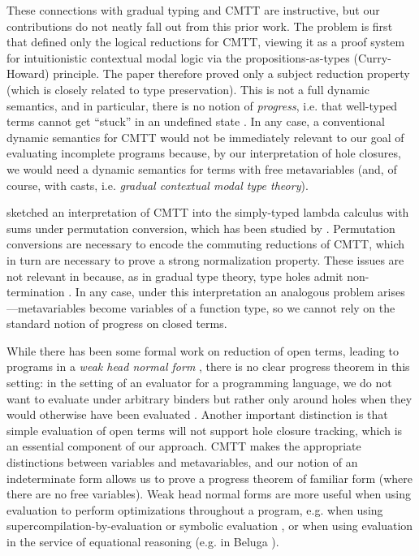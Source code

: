 %
These connections with gradual typing and CMTT are instructive, but our contributions do not neatly fall out from this prior work.
%
The problem is first that \citet{Nanevski2008} defined only the logical reductions for CMTT, viewing it as a proof system for intuitionistic contextual modal logic via the propositions-as-types (Curry-Howard) principle. 
The paper therefore proved only a subject reduction property (which is closely related to type preservation). 
This is not a full dynamic semantics, and in particular, there is no notion of \emph{progress}, i.e. that well-typed terms cannot get ``stuck'' in an undefined state \cite{wright94:_type_soundness}. 
In any case, a conventional dynamic semantics for CMTT would not be immediately relevant to our goal of evaluating incomplete programs because, by our interpretation of hole closures, we would need a dynamic semantics for terms with free metavariables (and, of course, with casts, i.e. \emph{gradual contextual modal type theory}).

\citet{Nanevski2008} sketched an interpretation of CMTT into the simply-typed lambda calculus with sums under permutation conversion, %
which has been studied by \citet{DBLP:journals/iandc/Groote02}. 
Permutation conversions are necessary to encode the commuting reductions of CMTT, which in turn are necessary to prove a strong normalization property. 
These issues are not relevant in \HazelnutLive because, as in gradual type theory, type holes admit non-termination \cite{Siek06a}.  
In any case, under this interpretation an analogous problem arises---metavariables become variables of a function type, so we cannot rely on the standard notion of progress on closed terms. 

While there has been some formal work on reduction of open terms, leading to programs in a \emph{weak head normal form} \cite{barendregt84:_lambda_calculus,DBLP:journals/corr/abs-1009-2789,Abramsky:1990vv}, there is no clear progress theorem in this setting: in the setting of an evaluator for a programming language, we do not want to evaluate under arbitrary binders but rather only around holes when they would otherwise have been evaluated \cite{DBLP:conf/birthday/BlancLM05}. Another important distinction is that simple evaluation of open terms will not support hole closure tracking, which is an essential component of our approach. CMTT makes the appropriate distinctions between variables and metavariables, and our notion of an indeterminate form allows us to prove a progress theorem of familiar form (where there are no free variables). Weak head normal forms are more useful when using evaluation to perform optimizations throughout a program, e.g. when using supercompilation-by-evaluation \cite{DBLP:conf/haskell/BolingbrokeJ10} or symbolic evaluation \cite{King:1976,SurveySymExec-CSUR18}, or when using evaluation in the service of equational reasoning (e.g. in Beluga \cite{DBLP:journals/corr/abs-1009-2789}).

